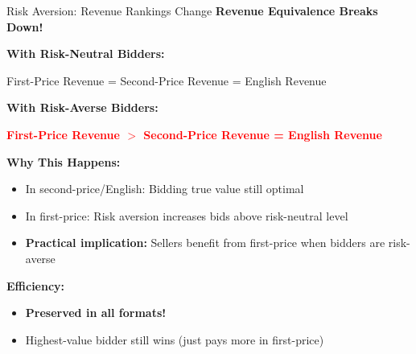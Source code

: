 \documentclass[xcolor={x11names}]{beamer}
\begin{document}
\begin{frame}{Risk Aversion: Revenue Rankings Change}
\textbf{Revenue Equivalence Breaks Down!}


\textbf{With Risk-Neutral Bidders:}
\begin{center}
First-Price Revenue = Second-Price Revenue = English Revenue
\end{center}


\textbf{With Risk-Averse Bidders:}
\begin{center}
\textcolor{red}{\textbf{First-Price Revenue $>$ Second-Price Revenue = English Revenue}}
\end{center}


\textbf{Why This Happens:}
\begin{itemize}
  \item In second-price/English: Bidding true value still optimal 
  \item In first-price: Risk aversion increases bids above risk-neutral level
  \item \textbf{Practical implication:} Sellers benefit from first-price when bidders are risk-averse
\end{itemize}


\textbf{Efficiency:}
\begin{itemize}
  \item \textcolor{green!70!black}{\textbf{Preserved in all formats!}}
  \item Highest-value bidder still wins (just pays more in first-price)
\end{itemize}
\end{frame}
\end{document}
